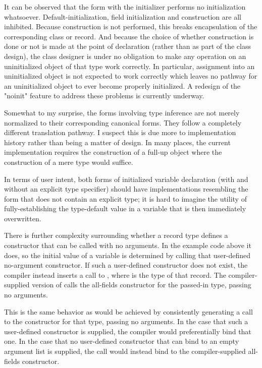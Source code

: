 It can be observed that the form with the  initializer performs no
initialization whatsoever.  Default-initialization, field initialization and construction are
all inhibited.  Because construction is not performed, this breaks encapsulation of the
corresponding class or record.  And because the choice of whether construction is done or
not is made at the point of declaration (rather than as part of the class design), the
class designer is under no obligation to make any operation on an uninitialized object of
that type work correctly.  In particular, assignment into an uninitialized object is
not expected to work correctly which leaves no pathway for an uninitialized
object to ever become properly initialized.  A redesign of the "noinit" feature to address
these problems is currently underway.

Somewhat to my surprise, the forms involving type inference are not merely normalized
to their corresponding canonical forms.  They follow a completely different translation
pathway.  I suspect this is due more to implementation history rather than being a matter
of design.  In many places, the current implementation requires the construction of a
full-up object where the construction of a mere type would suffice.  

In terms of user intent, both forms of initialized variable declaration (with and without
an explicit type specifier) should have implementations resembling the
form that does not contain an explicit type; it is hard to imagine the utility of
fully-establishing the type-default value in a variable that is then immediately overwritten.

There is further complexity surrounding whether a record type defines a constructor that
can be called with no arguments.  In the example code above it does, so the initial value of
a  variable is determined by calling that user-defined no-argument
constructor.  If such a user-defined constructor does not exist, the compiler instead
inserts a call to , where  is the type of that record.  The
compiler-supplied version of  calls the all-fields constructor for the
passed-in type, passing no arguments.  

This is the same behavior as would be achieved by consistently generating a call to the
constructor for that type, passing no arguments.  
In the case that such a user-defined
constructor is supplied, the compiler would preferentially bind that one.
In the case that no user-defined
constructor that can bind to an empty argument list is supplied, the call would instead bind to
the compiler-supplied all-fields constructor.  

